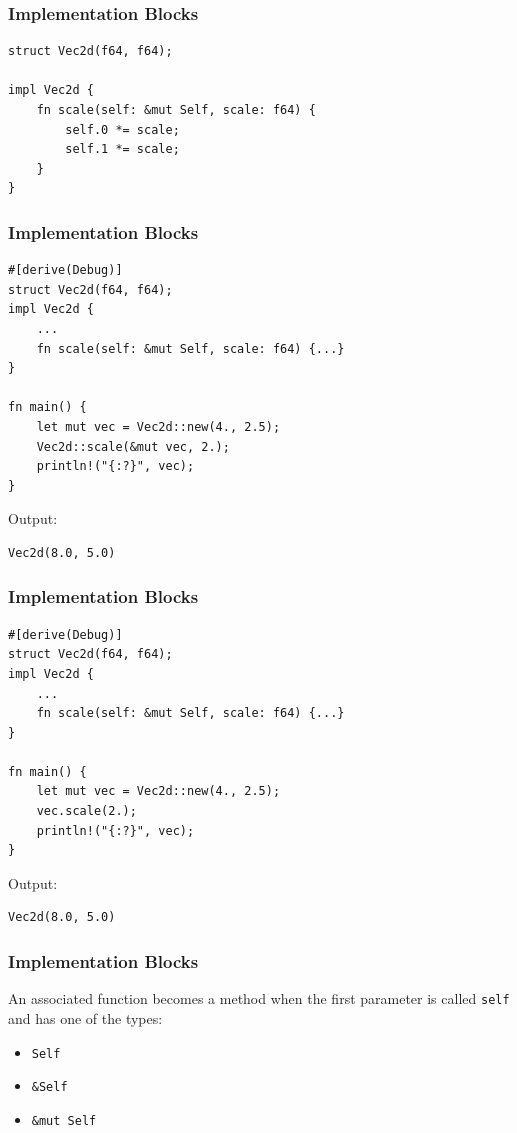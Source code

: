 \begin{frame}[fragile]
    \frametitle{Implementation Blocks}
    \begin{verbatim}
struct Vec2d(f64, f64);

impl Vec2d {
    fn scale(self: &mut Self, scale: f64) {
        self.0 *= scale;
        self.1 *= scale;
    }
}
    \end{verbatim}
\end{frame}

\begin{frame}[fragile]
    \frametitle{Implementation Blocks}
    \begin{verbatim}
#[derive(Debug)]
struct Vec2d(f64, f64);
impl Vec2d {
    ...
    fn scale(self: &mut Self, scale: f64) {...}
}

fn main() {
    let mut vec = Vec2d::new(4., 2.5);
    Vec2d::scale(&mut vec, 2.);
    println!("{:?}", vec);
}
    \end{verbatim}
    \pause
    \vfill
    Output:
    \begin{verbatim}
Vec2d(8.0, 5.0)
    \end{verbatim}
\end{frame}

\begin{frame}[fragile]
    \frametitle{Implementation Blocks}
    \begin{verbatim}
#[derive(Debug)]
struct Vec2d(f64, f64);
impl Vec2d {
    ...
    fn scale(self: &mut Self, scale: f64) {...}
}

fn main() {
    let mut vec = Vec2d::new(4., 2.5);
    vec.scale(2.);
    println!("{:?}", vec);
}
    \end{verbatim}
    \pause
    \vfill
    Output:
    \begin{verbatim}
Vec2d(8.0, 5.0)
    \end{verbatim}
\end{frame}

\begin{frame}[fragile]
    \frametitle{Implementation Blocks}
    An associated function becomes a method when the first parameter is called \texttt{self} and has one of the types:
    \begin{itemize}
        \item \texttt{Self}
        \item \texttt{\&Self}
        \item \texttt{\&mut Self}
    \end{itemize}
\end{frame}

